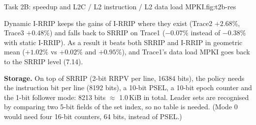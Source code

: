   {Task 2B: speedup and L2C / L2 instruction / L2 data load MPKI.}{fig:t2b-res}

Dynamic I-RRIP keeps the gains of I-RRIP where they exist (Trace2 $+2.68\%$, Trace3 $+0.48\%$) and falls back to SRRIP
on Trace1 ($-0.07\%$ instead of $-0.38\%$ with static I-RRIP). As a result it beats both SRRIP and I-RRIP in geometric
mean ($+1.02\%$ vs $+0.02\%$ and $+0.95\%$), and Trace1's data load MPKI goes back to the SRRIP level (7.14).

\textbf{Storage.} On top of SRRIP (2-bit RRPV per line, 16384 bits), the policy needs the instruction bit per line
(8192 bits), a 10-bit PSEL, a 10-bit epoch counter and the 1-bit follower mode: 8213 bits $\approx$ 1.0\,KiB in total.
Leader sets are recognised by comparing two 5-bit fields of the set index, so no table is needed. (Mode 0 would need
four 16-bit counters, 64 bits, instead of PSEL.)
